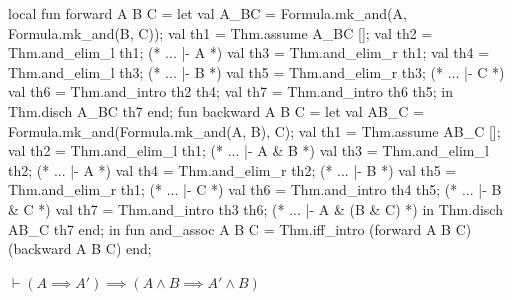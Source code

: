\nwenddocs{}\endmoddef\nwstartdeflinemarkup{}\nwenddeflinemarkup
local
  fun forward A B C =
    let
      val A_BC = Formula.mk_and(A, Formula.mk_and(B, C));
      val th1 = Thm.assume A_BC [];
      val th2 = Thm.and_elim_l th1; (* ... |- A *)
      val th3 = Thm.and_elim_r th1;
      val th4 = Thm.and_elim_l th3; (* ... |- B *)
      val th5 = Thm.and_elim_r th3; (* ... |- C *)
      val th6 = Thm.and_intro th2 th4;
      val th7 = Thm.and_intro th6 th5;
    in
      Thm.disch A_BC th7
    end;
  fun backward A B C =
    let
      val AB_C = Formula.mk_and(Formula.mk_and(A, B), C);
      val th1 = Thm.assume AB_C [];
      val th2 = Thm.and_elim_l th1; (* ... |- A & B *)
      val th3 = Thm.and_elim_l th2; (* ... |- A *)
      val th4 = Thm.and_elim_r th2; (* ... |- B *)
      val th5 = Thm.and_elim_r th1; (* ... |- C *)
      val th6 = Thm.and_intro th4 th5; (* ... |- B & C *)
      val th7 = Thm.and_intro th3 th6; (* ... |- A & (B & C) *)
    in
      Thm.disch AB_C th7
    end;
in
fun and_assoc A B C =
  Thm.iff_intro (forward A B C) (backward A B C)
end;
\eatline
{}\nwendcode{}\nwdocspar
\begin{node}
$\vdash(A\implies A')\implies(A\land B\implies A'\land B)$
\end{node}

